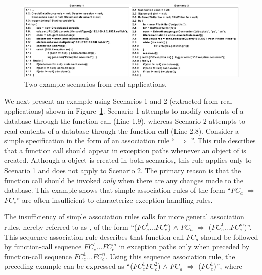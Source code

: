 \begin{figure}[t]
\centering
\includegraphics[scale=0.70,clip]{figs/three-code-examples1.eps}\vspace*{-3ex}
\centering \caption {\label{fig:threescenarios} Two example scenarios from real applications.}\vspace*{-4ex}
\end{figure}

We next present an example using Scenarios 1 and 2 (extracted 
from real applications) shown in Figure~\ref{fig:threescenarios}. 
Scenario 1 attempts to modify contents of a database through the function call
 (Line 1.9), whereas Scenario 2 attempts to read contents
of a database through the function call  (Line 2.8).
Consider a simple specification in the form of an association
rule `` $\Rightarrow$
''. This rule describes that a  function call should
appear in exception paths whenever an object of  is created. 
Although a  object is created in both
scenarios, this rule applies only to Scenario 1 and does not apply to Scenario 2.
The primary reason is that the  function call should be invoked \emph{only} when 
there are any changes made to the database. This example shows that
simple association rules of the form ``$FC_a$ $\Rightarrow$ $FC_e$''
are often insufficient to characterize exception-handling rules.

The insufficiency of simple association rules calls for 
more general association rules, hereby referred to as ,
of the form ``($FC_c^1$...$FC_c^n$) $\wedge$ $FC_a$ $\Rightarrow$ ($FC_e^1$...$FC_e^m$)''.
This sequence association rule describes that function call $FC_a$ should be followed 
by function-call sequence $FC_e^1$...$FC_e^m$ in exception paths only 
when preceded by function-call sequence $FC_c^1$...$FC_c^n$. Using this sequence association rule,
the preceding example can be expressed as ``($FC_c^1$$FC_c^2$) $\wedge$ 
$FC_a$ $\Rightarrow$ ($FC_e^1$)'', where

